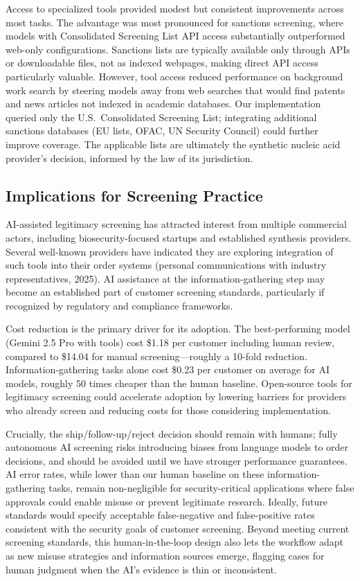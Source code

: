 \documentclass[utf8]{FrontiersinHarvard}
\begin{document}
Access to specialized tools provided modest but consistent improvements across most tasks. The advantage was most pronounced for sanctions screening, where models with Consolidated Screening List API access substantially outperformed web-only configurations. Sanctions lists are typically available only through APIs or downloadable files, not as indexed webpages, making direct API access particularly valuable. However, tool access reduced performance on background work search by steering models away from web searches that would find patents and news articles not indexed in academic databases. Our implementation queried only the U.S.\ Consolidated Screening List; integrating additional sanctions databases (EU lists, OFAC, UN Security Council) could further improve coverage. The applicable lists are ultimately the synthetic nucleic acid provider's decision, informed by the law of its jurisdiction.

\subsection{Implications for Screening Practice}

AI-assisted legitimacy screening has attracted interest from multiple commercial actors, including biosecurity-focused startups \citep{Aclid2025, TwentyTwo2026} and established synthesis providers. Several well-known providers have indicated they are exploring integration of such tools into their order systems (personal communications with industry representatives, 2025). AI assistance at the information-gathering step may become an established part of customer screening standards, particularly if recognized by regulatory and compliance frameworks.

Cost reduction is the primary driver for its adoption. The best-performing model (Gemini 2.5 Pro with tools) cost \$1.18 per customer including human review, compared to \$14.04 for manual screening—roughly a 10-fold reduction. Information-gathering tasks alone cost \$0.23 per customer on average for AI models, roughly 50 times cheaper than the human baseline. Open-source tools for legitimacy screening \citep{Cliver2025} could accelerate adoption by lowering barriers for providers who already screen and reducing costs for those considering implementation.

Crucially, the ship/follow-up/reject decision should remain with humans; fully autonomous AI screening risks introducing biases from language models to order decisions, and should be avoided until we have stronger performance guarantees. AI error rates, while lower than our human baseline on these information-gathering tasks, remain non-negligible for security-critical applications where false approvals could enable misuse or prevent legitimate research. Ideally, future standards would specify acceptable false-negative and false-positive rates consistent with the security goals of customer screening. Beyond meeting current screening standards, this human-in-the-loop design also lets the workflow adapt as new misuse strategies and information sources emerge, flagging cases for human judgment when the AI's evidence is thin or inconsistent.
\end{document}
